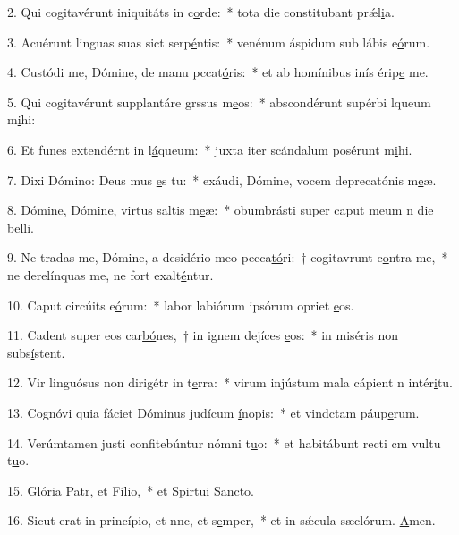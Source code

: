 2. Qui cogitavérunt iniquitáts in c\uline{o}rde:~* tota die constitubant prǽl\uline{i}a.\par 
3. Acuérunt linguas suas sict serp\uline{é}ntis:~* venénum áspidum sub lábis e\uline{ó}rum.\par 
4. Custódi me, Dómine, de manu pccat\uline{ó}ris:~* et ab homínibus inís érip\uline{e} me.\par 
5. Qui cogitavérunt supplantáre grssus m\uline{e}os:~* abscondérunt supérbi lqueum m\uline{i}hi:\par 
6. Et funes extendérnt in l\uline{á}queum:~* juxta iter scándalum posérunt m\uline{i}hi.\par 
7. Dixi Dómino: Deus mus \uline{e}s tu:~* exáudi, Dómine, vocem deprecatónis m\uline{e}æ.\par 
8. Dómine, Dómine, virtus saltis m\uline{e}æ:~* obumbrásti super caput meum n die b\uline{e}lli.\par 
9. Ne tradas me, Dómine, a desidério meo pecca\uline{tó}ri:~† cogitavrunt c\uline{o}ntra me,~* ne derelínquas me, ne fort exalt\uline{é}ntur.\par 
10. Caput circúits e\uline{ó}rum:~* labor labiórum ipsórum opriet \uline{e}os.\par 
11. Cadent super eos car\uline{bó}nes,~† in ignem dejíces \uline{e}os:~* in miséris non subs\uline{í}stent.\par 
12. Vir linguósus non dirigétr in t\uline{e}rra:~* virum injústum mala cápient n intér\uline{i}tu.\par 
13. Cognóvi quia fáciet Dóminus judícum \uline{í}nopis:~* et vindctam páup\uline{e}rum.\par 
14. Verúmtamen justi confitebúntur nómni t\uline{u}o:~* et habitábunt recti cm vultu t\uline{u}o.\par 
15. Glória Patr, et F\uline{í}lio,~* et Spirtui S\uline{a}ncto.\par 
16. Sicut erat in princípio, et nnc, et s\uline{e}mper,~* et in sǽcula sæclórum. \uline{A}men.\par 
